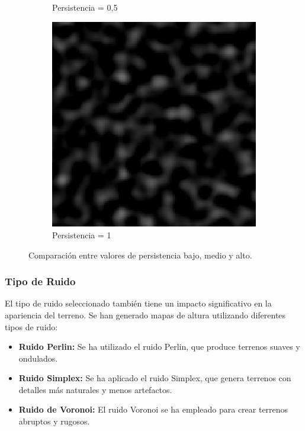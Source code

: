 \begin{figure}[ht]
\begin{subfigure}{0.3\linewidth}
        \caption{Persistencia = 0,5 }
    \end{subfigure}
    \hfill
    \begin{subfigure}{0.3\linewidth}
        \centering
        \includegraphics[width=\linewidth]{img/HeightPers.png}
        \caption{Persistencia = 1 }
    \end{subfigure}
    \caption{Comparación entre valores de persistencia bajo, medio y alto.}
\end{figure}


\subsubsection{Tipo de Ruido}

El tipo de ruido seleccionado también tiene un impacto significativo en la apariencia del terreno. Se han generado mapas de altura utilizando diferentes tipos de ruido:

\begin{itemize}
    \item \textbf{Ruido Perlin:} Se ha utilizado el ruido Perlin, que produce terrenos suaves y ondulados.
    \item \textbf{Ruido Simplex:} Se ha aplicado el ruido Simplex, que genera terrenos con detalles más naturales y menos artefactos.
    \item \textbf{Ruido de Voronoi:} El ruido Voronoi se ha empleado para crear terrenos abruptos y rugosos.
\end{itemize}

